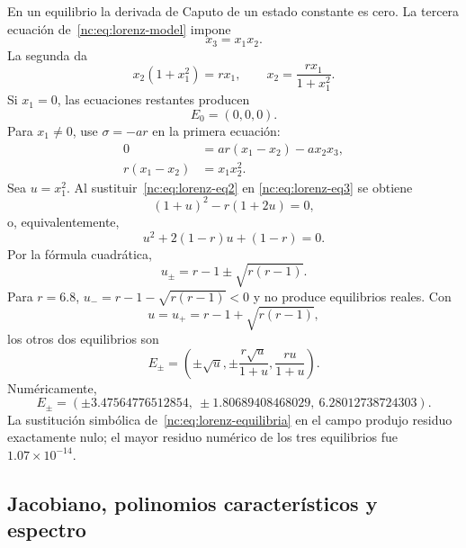 En un equilibrio la derivada de Caputo de un estado constante es cero. La
tercera ecuación de~\eqref{nc:eq:lorenz-model} impone
\begin{equation}
 x_3=x_1x_2.
 \label{nc:eq:lorenz-eq1}
\end{equation}
La segunda da
\begin{equation}
 x_2(1+x_1^2)=r x_1,
 \qquad
 x_2=\frac{r x_1}{1+x_1^2}.
 \label{nc:eq:lorenz-eq2}
\end{equation}
Si \(x_1=0\), las ecuaciones restantes producen
\begin{equation}
 E_0=(0,0,0).
\end{equation}
Para \(x_1\neq0\), use \(\sigma=-ar\) en la primera ecuación:
\begin{align}
 0&=ar(x_1-x_2)-a x_2x_3,\\
 r(x_1-x_2)&=x_1x_2^2.
 \label{nc:eq:lorenz-eq3}
\end{align}
Sea \(u=x_1^2\). Al sustituir~\eqref{nc:eq:lorenz-eq2} en
\eqref{nc:eq:lorenz-eq3} se obtiene
\begin{equation}
 (1+u)^2-r(1+2u)=0,
\end{equation}
o, equivalentemente,
\begin{equation}
 u^2+2(1-r)u+(1-r)=0.
\end{equation}
Por la fórmula cuadrática,
\begin{equation}
 u_{\pm}=r-1\pm\sqrt{r(r-1)}.
 \label{nc:eq:lorenz-u}
\end{equation}
Para \(r=6.8\), \(u_-=r-1-\sqrt{r(r-1)}<0\) y no produce equilibrios
reales. Con
\begin{equation}
 u=u_+=r-1+\sqrt{r(r-1)},
\end{equation}
los otros dos equilibrios son
\begin{equation}
 E_{\pm}=\left(
 \pm\sqrt u,
 \pm\frac{r\sqrt u}{1+u},
 \frac{ru}{1+u}
 \right).
 \label{nc:eq:lorenz-equilibria}
\end{equation}
Numéricamente,
\begin{equation}
 E_{\pm}=(\pm3.47564776512854,
 \ \pm1.80689408468029,
 \ 6.28012738724303).
 \label{nc:eq:lorenz-equilibria-num}
\end{equation}
La sustitución simbólica de~\eqref{nc:eq:lorenz-equilibria} en el campo produjo
residuo exactamente nulo; el mayor residuo numérico de los tres equilibrios fue
\(1.07\times10^{-14}\).

\subsection{Jacobiano, polinomios característicos y espectro}

